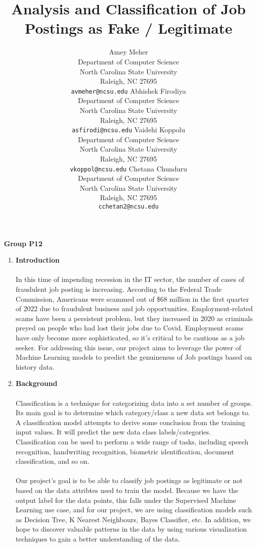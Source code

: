 \documentclass{article}
\title{\textbf{Analysis and Classification of Job Postings as Fake / Legitimate}}
\author{
Amey Meher\\
Department of Computer Science\\ 
North Carolina State University\\
Raleigh, NC 27695 \\
\texttt{avmeher@ncsu.edu}
\And
Abhishek Firodiya \\
Department of Computer Science\\ 
North Carolina State University\\
Raleigh, NC 27695 \\
\texttt{asfirodi@ncsu.edu}
\And
Vaidehi Koppolu       \\
Department of Computer Science\\ 
North Carolina State University\\
Raleigh, NC 27695 \\
\texttt{vkoppol@ncsu.edu}
\And
Chetana Chunduru \\
Department of Computer Science\\ 
North Carolina State University\\
Raleigh, NC 27695 \\
\texttt{cchetan2@ncsu.edu}
}
\date{} %
\begin{document}
    \renewcommand{\labelenumii}{\arabic{enumi}.\arabic{enumii}}
    \renewcommand{\labelenumiii}{\arabic{enumi}.\arabic{enumii}.\arabic{enumiii}}
    \renewcommand{\labelenumiv}{\arabic{enumi}.\arabic{enumii}.\arabic{enumiii}.\arabic{enumiv}}
    \renewcommand{\labelitemi}{$\bullet$}
    \renewcommand{\labelitemi}{$\bullet.\bullet$}

    \maketitle

    \vspace{-30pt}
    \begin{center}
        \textbf{Group P12}
    \end{center}

    \begin{enumerate}[wide, labelwidth=!, labelindent=0pt]
        \item \textbf{Introduction}\\\\
        In this time of impending recession in the IT sector, the number of cases of fraudulent job posting is increasing. According to the Federal Trade Commission, Americans were scammed out of \$68 million in the first quarter of 2022 due to fraudulent business and job opportunities. Employment-related scams have been a persistent problem, but they increased in 2020 as criminals preyed on people who had lost their jobs due to Covid. Employment scams have only become more sophisticated, so it's critical to be cautious as a job seeker. For addressing this issue, our project aims to leverage the power of Machine Learning models to predict the genuineness of Job postings based on history data. \\

        \item \textbf{Background}\\\\
        Classification is a technique for categorizing data into a set number of groups. Its main goal is to determine which category/class a new data set belongs to. A classification model attempts to derive some conclusion from the training input values. It will predict the new data class labels/categories. Classification can be used to perform a wide range of tasks, including speech recognition, handwriting recognition, biometric identification, document classification, and so on.\\\\
        Our project's goal is to be able to classify job postings as legitimate or not based on the data attribtes used to train the model. Because we have the output label for the data points, this falls under the Supervised Machine Learning use case, and for our project, we are using classification models such as Decision Tree, K Nearest Neighbours, Bayes Classifier, etc. In addition, we hope to discover valuable patterns in the data by using various visualization techniques to gain a better understanding of the data.\\\\


\end{enumerate}
\end{document}
